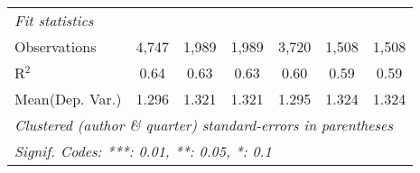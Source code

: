 \begin{tabular}{lcccccc}
   \midrule
   \emph{Fit statistics}\\
   Observations            & 4,747   & 1,989   & 1,989   & 3,720       & 1,508   & 1,508\\  
   R$^2$                   & 0.64    & 0.63    & 0.63    & 0.60        & 0.59    & 0.59\\  
Mean(Dep. Var.) & 1.296 & 1.321 & 1.321 & 1.295 & 1.324 & 1.324 \\
   \midrule \midrule
   \multicolumn{7}{l}{\emph{Clustered (author \& quarter) standard-errors in parentheses}}\\
   \multicolumn{7}{l}{\emph{Signif. Codes: ***: 0.01, **: 0.05, *: 0.1}}\\
\end{tabular}
\par\endgroup
